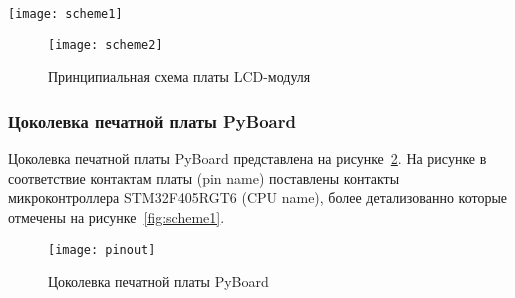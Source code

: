 \documentclass[document.tex]{subfiles}
\begin{document}
\begin{sidewaysfigure}
\centering
\texttt{[image: scheme1]}
\caption{Принципиальная схема PyBoard}
\label{fig:scheme1}
\end{sidewaysfigure}

\begin{figure}
\centering
\texttt{[image: scheme2]}
\caption{Принципиальная схема платы LCD-модуля}
\label{fig:scheme2}
\end{figure}

\clearpage
\subsubsection{Цоколевка печатной платы PyBoard}
Цоколевка печатной платы PyBoard представлена на рисунке~\ref{fig:pinout}. На рисунке в соответ\-ствие контактам платы (pin name) поставлены контакты микрокон\-троллера
STM32F405RGT6 (CPU name), более детализованно которые отмечены на рисунке~\ref{fig:scheme1}.
\begin{figure}[h]
\centering
\texttt{[image: pinout]}
\caption{Цоколевка печатной платы PyBoard}
\label{fig:pinout}
\end{figure}
\end{document}

